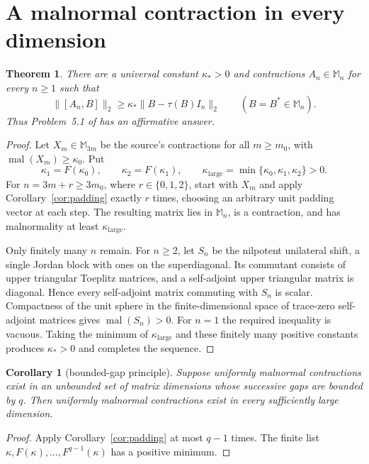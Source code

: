 \documentclass[11pt]{article}
\newtheorem{theorem}{Theorem}
\newtheorem{corollary}{Corollary}
\newcommand{\mal}{\operatorname{mal}}
\newcommand{\M}{\mathbb M}
\begin{document}
\section{A malnormal contraction in every dimension}

\begin{theorem}\label{thm:alln}
There are a universal constant $\kappa_*>0$ and contractions
$A_n\in\M_n$ for every $n\geq1$ such that
\[
       \|[A_n,B]\|_2\geq\kappa_*\|B-\tau(B)I_n\|_2
       \qquad(B=B^*\in\M_n).
\]
Thus Problem~5.1 of \cite{MS} has an affirmative answer.
\end{theorem}

\begin{proof}
Let $X_m\in\M_{3m}$ be the source's contractions for all $m\geq m_0$, with
$\mal(X_m)\geq\kappa_0$.  Put
\[
 \kappa_1=F(\kappa_0),\qquad
 \kappa_2=F(\kappa_1),\qquad
 \kappa_{\mathrm{large}}=\min\{\kappa_0,\kappa_1,\kappa_2\}>0.
\]
For $n=3m+r\geq3m_0$, where $r\in\{0,1,2\}$, start with $X_m$ and apply
Corollary~\ref{cor:padding} exactly $r$ times, choosing an arbitrary unit
padding vector at each step.  The resulting matrix lies in $\M_n$, is a
contraction, and has malnormality at least
$\kappa_{\mathrm{large}}$.

Only finitely many $n$ remain.  For $n\geq2$, let $S_n$ be the nilpotent
unilateral shift, a single Jordan block with ones on the superdiagonal.  Its
commutant consists of upper triangular Toeplitz matrices, and a self-adjoint
upper triangular matrix is diagonal.  Hence every self-adjoint matrix
commuting with $S_n$ is scalar.  Compactness of the unit sphere in the
finite-dimensional space of trace-zero self-adjoint matrices gives
$\mal(S_n)>0$.  For $n=1$ the required inequality is vacuous.  Taking the
minimum of $\kappa_{\mathrm{large}}$ and these finitely many positive constants
produces $\kappa_*>0$ and completes the sequence.
\end{proof}

\begin{corollary}[bounded-gap principle]
Suppose uniformly malnormal contractions exist in an unbounded set of matrix
dimensions whose successive gaps are bounded by $q$.  Then uniformly
malnormal contractions exist in every sufficiently large dimension.
\end{corollary}

\begin{proof}
Apply Corollary~\ref{cor:padding} at most $q-1$ times.  The finite list
$\kappa,F(\kappa),\ldots,F^{q-1}(\kappa)$ has a positive minimum.
\end{proof}
\end{document}
